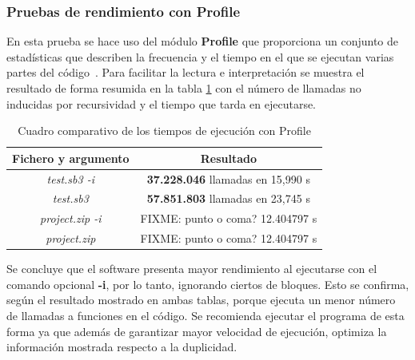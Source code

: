 \documentclass[a4paper, 12pt]{book}
\begin{document}
\subsubsection{Pruebas de rendimiento con Profile}

En esta prueba se hace uso del módulo \textbf{Profile} que proporciona un conjunto de estadísticas que describen la frecuencia y el tiempo en el que se ejecutan varias partes del código~\cite{profileWeb}. Para facilitar la lectura e interpretación se muestra el resultado de forma resumida en la tabla \ref{table:profile} con el número de llamadas no inducidas por recursividad y el tiempo que tarda en ejecutarse.

\begin{table}[!htb]
 \begin{center}
  \begin{tabular}{ | c | c |} %
	\hline
     Fichero y argumento & Resultado  \\ \hline %
	\textit{test.sb3 -i}  & \textbf{37.228.046} llamadas en 15,990 s \\ \hline
    \textit{test.sb3}  & \textbf{57.851.803} llamadas en 23,745 s \\ \hline
    \textit{project.zip -i} & FIXME: punto o coma? 12.404797 s \\ \hline
    \textit{project.zip} & FIXME: punto o coma? 12.404797 s \\ \hline
  \end{tabular}
  \caption{Cuadro comparativo de los tiempos de ejecución con Profile\label{table:profile}}
 \end{center}
\end{table}

Se concluye que el software presenta mayor rendimiento al ejecutarse con el comando opcional \textbf{-i}, por lo tanto, ignorando ciertos de bloques. Esto se confirma, según el resultado mostrado en ambas tablas, porque ejecuta un menor número de llamadas a funciones en el código. Se recomienda ejecutar el programa de esta forma ya que además de garantizar mayor velocidad de ejecución, optimiza la información mostrada respecto a la duplicidad.


\end{document}

